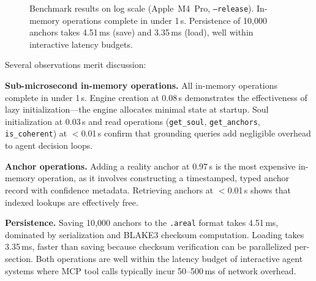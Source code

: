 \documentclass[10pt, twocolumn]{article}
\begin{document}
\begin{figure}[t]
\centering
{}
\caption{Benchmark results on log scale (Apple~M4~Pro, \texttt{--release}). In-memory operations complete in under 1\,\textmu{}s. Persistence of 10{,}000 anchors takes 4.51\,ms (save) and 3.35\,ms (load), well within interactive latency budgets.}
\label{fig:benchmarks}
\end{figure}

Several observations merit discussion:

\textbf{Sub-microsecond in-memory operations.} All in-memory operations complete in under 1\,\textmu{}s. Engine creation at 0.08\,\textmu{}s demonstrates the effectiveness of lazy initialization---the engine allocates minimal state at startup. Soul initialization at 0.03\,\textmu{}s and read operations (\texttt{get\_soul}, \texttt{get\_anchors}, \texttt{is\_coherent}) at $<$0.01\,\textmu{}s confirm that grounding queries add negligible overhead to agent decision loops.

\textbf{Anchor operations.} Adding a reality anchor at 0.97\,\textmu{}s is the most expensive in-memory operation, as it involves constructing a timestamped, typed anchor record with confidence metadata. Retrieving anchors at $<$0.01\,\textmu{}s shows that indexed lookups are effectively free.

\textbf{Persistence.} Saving 10{,}000 anchors to the \texttt{.areal} format takes 4.51\,ms, dominated by serialization and BLAKE3 checksum computation. Loading takes 3.35\,ms, faster than saving because checksum verification can be parallelized per-section. Both operations are well within the latency budget of interactive agent systems where MCP tool calls typically incur 50--500\,ms of network overhead.
\end{document}
